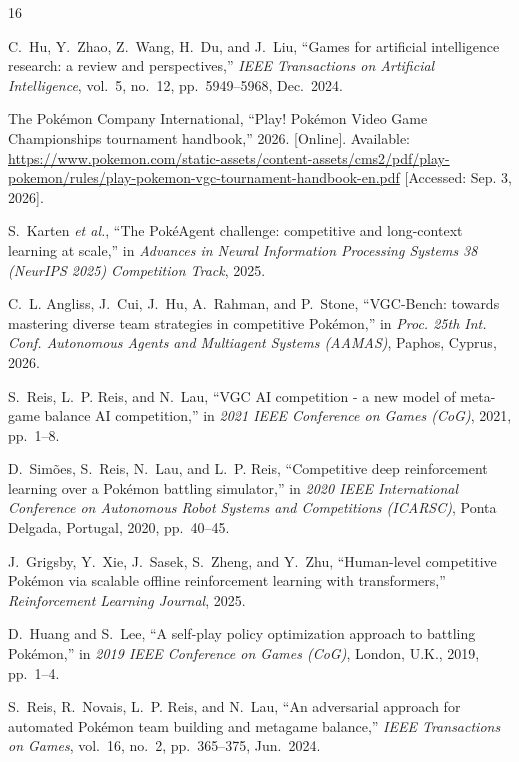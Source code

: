 \documentclass[conference]{IEEEtran}
\begin{document}
\begin{thebibliography}{16}

C.~Hu, Y.~Zhao, Z.~Wang, H.~Du, and J.~Liu, ``Games for artificial intelligence research: a review and perspectives,''
\emph{IEEE Transactions on Artificial Intelligence}, vol.~5, no.~12, pp.~5949--5968, Dec.~2024.

The Pok\'emon Company International, ``Play! Pok\'emon Video Game Championships
tournament handbook,'' 2026. [Online].
Available: \url{https://www.pokemon.com/static-assets/content-assets/cms2/pdf/play-pokemon/rules/play-pokemon-vgc-tournament-handbook-en.pdf}
[Accessed: Sep. 3, 2026].

S.~Karten \emph{et al.}, ``The Pok\'eAgent challenge: competitive and long-context learning at scale,''
in \emph{Advances in Neural Information Processing Systems 38 (NeurIPS 2025) Competition Track}, 2025.

C.~L. Angliss, J.~Cui, J.~Hu, A.~Rahman, and P.~Stone, ``VGC-Bench: towards mastering diverse team strategies in competitive Pok\'emon,''
in \emph{Proc. 25th Int. Conf. Autonomous Agents and Multiagent Systems (AAMAS)}, Paphos, Cyprus, 2026.



S.~Reis, L.~P. Reis, and N.~Lau, ``VGC AI competition - a new model of meta-game balance AI competition,''
in \emph{2021 IEEE Conference on Games (CoG)}, 2021, pp.~1--8.

D.~Sim\~oes, S.~Reis, N.~Lau, and L.~P. Reis, ``Competitive deep reinforcement learning over a Pok\'emon battling simulator,''
in \emph{2020 IEEE International Conference on Autonomous Robot Systems and Competitions (ICARSC)}, Ponta Delgada, Portugal, 2020, pp.~40--45.

J.~Grigsby, Y.~Xie, J.~Sasek, S.~Zheng, and Y.~Zhu, ``Human-level competitive Pok\'emon via scalable offline reinforcement learning with transformers,''
\emph{Reinforcement Learning Journal}, 2025.

D.~Huang and S.~Lee, ``A self-play policy optimization approach to battling Pok\'emon,''
in \emph{2019 IEEE Conference on Games (CoG)}, London, U.K., 2019, pp.~1--4.

S.~Reis, R.~Novais, L.~P. Reis, and N.~Lau, ``An adversarial approach for automated Pok\'emon team building and metagame balance,''
\emph{IEEE Transactions on Games}, vol.~16, no.~2, pp.~365--375, Jun.~2024.


\end{thebibliography}
\end{document}
